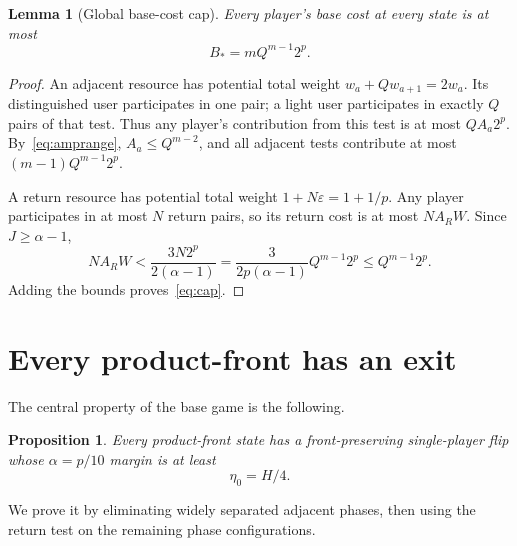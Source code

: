 \documentclass[11pt]{article}
\newtheorem{lemma}[theorem]{Lemma}
\newtheorem{proposition}[theorem]{Proposition}
\theoremstyle{definition}
\theoremstyle{remark}
\begin{document}
\begin{lemma}[Global base-cost cap]\label{lem:cap}
Every player's base cost at every state is at most
\begin{equation}\label{eq:cap}
 B_*=mQ^{m-1}2^p.
\end{equation}
\end{lemma}
\begin{proof}
An adjacent resource has potential total weight $w_a+Qw_{a+1}=2w_a$. Its distinguished user participates in one pair; a light user participates in exactly $Q$ pairs of that test. Thus any player's contribution from this test is at most $QA_a2^p$. By~\eqref{eq:amprange}, $A_a\le Q^{m-2}$, and all adjacent tests contribute at most $(m-1)Q^{m-1}2^p$.

A return resource has potential total weight $1+N\varepsilon=1+1/p$. Any player participates in at most $N$ return pairs, so its return cost is at most $NA_RW$. Since $J\ge\alpha-1$,
\[
 NA_RW<\frac{3N2^p}{2(\alpha-1)}
 =\frac3{2p(\alpha-1)}Q^{m-1}2^p
 \le Q^{m-1}2^p.
\]
Adding the bounds proves~\eqref{eq:cap}.
\end{proof}

\section{Every product-front has an exit}\label{sec:fronts}
The central property of the base game is the following.
\begin{proposition}\label{prop:frontcover}
Every product-front state has a front-preserving single-player flip whose $\alpha=p/10$ margin is at least
\[
 \eta_0=H/4.
\]
\end{proposition}
We prove it by eliminating widely separated adjacent phases, then using the return test on the remaining phase configurations.
\end{document}
